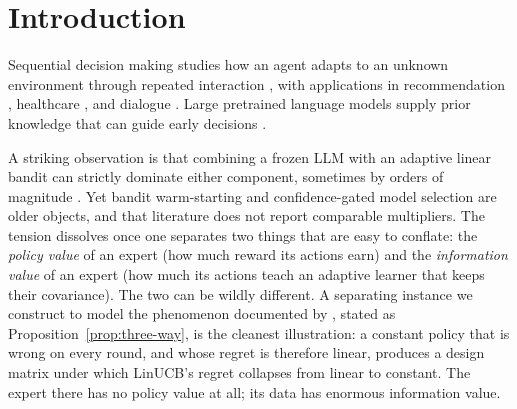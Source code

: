 \documentclass{article}
\theoremstyle{definition}
\theoremstyle{remark}
\theoremstyle{remark}
\begin{document}
\begin{abstract}
bound. A warm start therefore acts through two channels, coverage and
transfer, and on real data the transfer is the larger. On AmazonCat-13K three
LLM experts of equal accuracy raise the router's accuracy over cold LinUCB by
factors of $1.71$, $2.72$ and $3.29$, which is $6.5\%$, $16\%$ and $21\%$ less
regret. Coverage alone saves about $5\%$, the same for all three experts, as
the theory requires; the rest, and every significant difference between the
experts, comes from the transfer, and removing it by any of three independent
mechanisms collapses those differences. Which expert makes the better warm
start is decided by the residuals its choices carry, not by its accuracy.
\end{abstract}


\section{Introduction}
\label{sec:intro}

Sequential decision making studies how an agent adapts to an unknown
environment through repeated interaction \cite{zhu2022largeaction,zhu2022contextual},
with applications in recommendation \cite{li2010contextual,agarwal2016making},
healthcare \cite{tewari2017ads,svensson2023sequential}, and dialogue
\cite{li2016deep}. Large pretrained language models supply prior knowledge that
can guide early decisions
\cite{brown2020language,ouyang2022training,achiam2023gpt,
alamdari2024jumpstarting,abbasiyadkori2024believe}.

A striking observation is that combining a frozen LLM with an adaptive linear
bandit can strictly dominate either component, sometimes by orders of magnitude
\cite{chen2024llmdecision,huangcontextual}. Yet bandit warm-starting
\cite{bastani2021mostly,zhang2019warm} and confidence-gated model selection
\cite{auer2002nonstochastic,agarwal2017corralling,pacchiano2020model} are older
objects, and that literature does not report comparable multipliers. The
tension dissolves once one separates two things that are easy to conflate:
the \emph{policy value} of an expert (how much reward its actions earn) and
the \emph{information value} of an expert (how much its actions teach an
adaptive learner that keeps their covariance). The two can be wildly
different. A separating instance we construct to model the phenomenon
documented by \cite{chen2024llmdecision}, stated as
Proposition~\ref{prop:three-way}, is the cleanest illustration:
a constant policy that is wrong on every round, and whose regret is therefore
linear, produces a design matrix under which LinUCB's regret collapses from
linear to constant. The expert there has no policy value at all; its data has
enormous information value.
\end{document}
